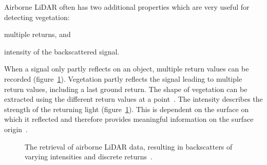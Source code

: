 Airborne LiDAR often has two additional properties which are very useful for detecting vegetation:
\begin{enumerate*}[(i)]
	\item multiple returns, and
	\item intensity of the backscattered signal.
\end{enumerate*}
When a signal only partly reflects on an object, multiple return values can be recorded (figure~\ref{fig:LiDAR}).
Vegetation partly reflects the signal leading to multiple return values, including a last ground return. The shape of vegetation can be extracted using the different return values at a point~\citep{lim2003lidar}. The intensity describes the strength of the returning light (figure~\ref{fig:LiDAR}).
This is dependent on the surface on which it reflected and therefore provides meaningful information on the surface origin~\citep{song2002assessing}.
\begin{figure}
	\centering
	\caption{The retrieval of airborne LiDAR data, resulting in backscatters of varying intensities and discrete returns~\citep{yan2015urban}.}
	\label{fig:LiDAR}
\end{figure}

\medskip

